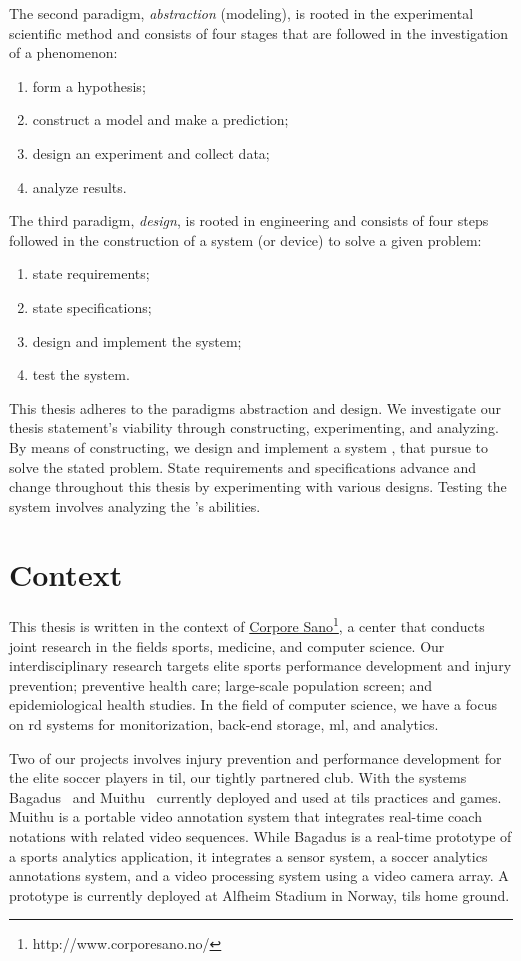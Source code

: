The second paradigm, \emph{abstraction} (modeling), is rooted in the experimental scientific method and consists of four stages that are followed in the investigation of a phenomenon: 
\begin{enumerate}
    \item form a hypothesis;
    \item construct a model and make a prediction;
    \item design an experiment and collect data;
    \item analyze results.
\end{enumerate}

The third paradigm, \emph{design}, is rooted in engineering and consists of four steps followed in the construction of a system (or device) to solve a given problem:
\begin{enumerate}
    \item state requirements; 
    \item state specifications;
    \item design and implement the system;
    \item test the system.
\end{enumerate}

This thesis adheres to the paradigms abstraction and design. We investigate our thesis statement's viability through constructing, experimenting, and analyzing. By means of constructing, we design and implement a system \project, that pursue to solve the stated problem. State requirements and specifications advance and change throughout this thesis by experimenting with various designs. Testing the system involves analyzing the \project's abilities.

\section{Context}\label{sec:context}
This thesis is written in the context of \href{http://www.corporesano.no/}{Corpore Sano}\footnote{http://www.corporesano.no/}, a center that conducts joint research in the fields sports, medicine, and computer science. Our interdisciplinary research targets elite sports performance development and injury prevention; preventive health care; large-scale population screen; and epidemiological health studies. In the field of computer science, we have a focus on \ac{rd} systems for monitorization, back-end storage, \ac{ml}, and analytics.

Two of our projects involves injury prevention and performance development for the elite soccer players in \ac{til}, our tightly partnered club. With the systems Bagadus~\cite{halvorsen2013bagadus} and Muithu~\cite{johansen2012muithu} currently deployed and used at \acp{til} practices and games. Muithu is a portable video annotation system that integrates real-time coach notations with related video sequences. While Bagadus is a real-time prototype of a sports analytics application, it integrates a sensor system, a soccer analytics annotations system, and a video processing system using a video camera array. A prototype is currently deployed at Alfheim Stadium in Norway, \acp{til} home ground.

